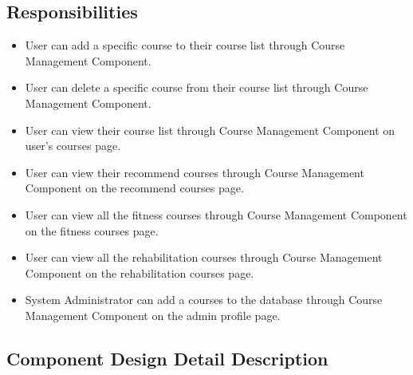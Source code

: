 \documentclass[16pt]{scrreprt}
\begin{document}
\subsection{Responsibilities}
\begin{itemize}
	\item User can add a specific course to their course list through Course Management Component.
	\item User can delete a specific course from their course list through Course Management Component.
	\item User can view their course list through Course Management Component on user's courses page.
	\item User can view their recommend courses through Course Management Component on the recommend courses page.
	\item User can view all the fitness courses through Course Management Component on the fitness courses page.
	\item User can view all the rehabilitation courses through Course Management Component on the rehabilitation courses page.
	\item System Administrator can add a courses to the database through Course Management Component on the admin profile page.
\end{itemize}

\subsection{Component Design Detail Description}
\end{document}
